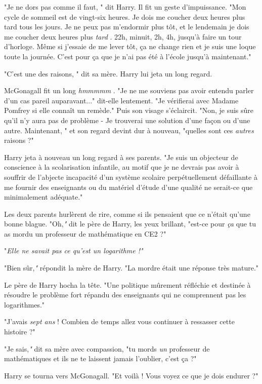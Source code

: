 "Je ne dors pas comme il faut, " dit Harry. Il fit un geste d'impuissance. "Mon cycle de sommeil est de vingt-six heures. Je dois me coucher deux heures plus tard tous les jours. Je ne peux pas m'endormir plus tôt, et le lendemain je dois me coucher deux heures plus \emph{tard} . 22h, minuit, 2h, 4h, jusqu'à faire un tour d'horloge. Même si j'essaie de me lever tôt, ça ne change rien et je suis une loque toute la journée. C'est pour ça que je n'ai pas été à l'école jusqu'à maintenant."

"C'est une des raisons, " dit sa mère. Harry lui jeta un long regard.

McGonagall fit un long \emph{hmmmmm} . "Je ne me souviens pas avoir entendu parler d'un cas pareil auparavant..." dit-elle lentement. "Je vérifierai avec Madame Pomfrey si elle connaît un remède." Puis son visage s'éclaircit. "Non, je suis sûre qu'il n'y aura pas de problème - Je trouverai une solution d'une façon ou d'une autre. Maintenant, " et son regard devint dur à nouveau, "quelles sont ces \emph{autres}  raisons ?"

Harry jeta à nouveau un long regard à ses parents. "Je suis un objecteur de conscience à la scolarisation infantile, au motif que je ne devrais pas avoir à souffrir de l'abjecte incapacité d'un système scolaire perpétuellement défaillante à me fournir des enseignants ou du matériel d'étude d'une qualité ne serait-ce que minimalement adéquate."

Les deux parents hurlèrent de rire, comme si ils pensaient que ce n'était qu'une bonne blague. "Oh,\emph{"}  dit le père de Harry, les yeux brillant, "est-ce pour \emph{ça}  que tu as mordu un professeur de mathématique en CE2 ?"

"\emph{Elle ne savait pas ce qu'est un logarithme !"} 

"Bien sûr,\emph{"}  répondit la mère de Harry. "La mordre était une réponse très mature."

Le père de Harry hocha la tête. "Une politique mûrement réfléchie et destinée à résoudre le problème fort répandu des enseignants qui ne comprennent pas les logarithmes."

"J'avais \emph{sept ans}  ! Combien de temps allez vous continuer à ressasser cette histoire ?"

"Je sais,\emph{"}  dit sa mère avec compassion, "tu mords \emph{un } professeur de mathématiques et ils ne te laissent jamais l'oublier, c'est ça ?"

Harry se tourna vers McGonagall. "Et voilà ! Vous voyez ce que je dois endurer ?"

